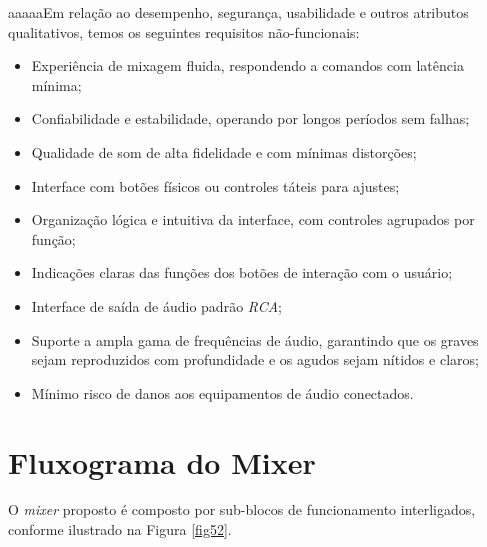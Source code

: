 aaaaaEm relação ao desempenho, segurança, usabilidade e outros atributos qualitativos, temos os seguintes requisitos não-funcionais:

\begin{itemize}
    \item %
    Experiência de mixagem fluida, respondendo a comandos com latência mínima;
    \item Confiabilidade e estabilidade, operando por longos períodos sem falhas;
    \item %
    Qualidade de som de alta fidelidade e com mínimas distorções; %
    \item Interface com botões físicos ou controles táteis para ajustes; %
    \item Organização lógica e intuitiva da interface, %
    com controles agrupados por função; %
    \item %
    Indicações claras das funções dos botões de interação com o usuário;
    \item %
    Interface de saída de áudio padrão \textit{RCA};
    \item %
    Suporte a ampla gama de frequências de áudio, garantindo que os graves sejam reproduzidos com profundidade e os agudos sejam nítidos e claros;
    \item %
    Mínimo risco de danos aos equipamentos de áudio conectados.
\end{itemize}



\section{Fluxograma do Mixer}

O \textit{mixer} proposto é composto por sub-blocos de funcionamento interligados, conforme ilustrado na Figura \ref{fig52}.

